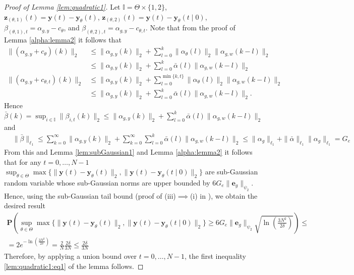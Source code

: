 \documentclass{article}
\newcommand{\e}{\mathbf{e}}
\newcommand{\y}{\mathbf{y}}
\newcommand{\z}{\mathbf{z}}
\newcommand{\bP}{\mathbf{P}}
\begin{document}
\begin{proof}[Proof of Lemma \ref{lem:quadratic1}]
    Let $\mathbb{I}=\Theta \times \{1,2\}$,
    $\z_{(\theta,1)}(t)=\y(t)-\y_{\theta}(t)$, 
    $\z_{(\theta,2)}(t)=\y(t)-\y_{\theta}(t \mid 0)$,
    $\beta_{(\theta,1),t}=\alpha_{g,y}-c_{\theta}$, and $\beta_{(\theta,2),t}=\alpha_{g,y}-c_{\theta,t}$.
    Note that from the proof of Lemma \ref{alpha:lemma2} it follows
    that 
    \begin{align*}
     \|(\alpha_{g,y}+c_{\theta})(k)\|_2 
    &\le \|\alpha_{g,y}(k)\|_2+\sum_{l=0}^{k} \|\alpha_{\theta}(l)\|_2\|\alpha_{g,w}(k-l)\|_2 \\
    &\le\|\alpha_{g,y}(k)\|_2+ \sum_{l=0}^{k} \bar{\alpha}(l)\|\alpha_{g,w}(k-l)\|_2 \\
     \|(\alpha_{g,y}+c_{\theta,t})(k)\|_2 
     &\le \|\alpha_{g,y}(k)\|_2+\sum_{l=0}^{\min\{k,t\}} \|\alpha_{\theta}(l)\|_2\|\alpha_{g,w}(k-l)\|_2\\ 
     &\le \|\alpha_{g,y}(k)\|_2+\sum_{l=0}^{k} \bar{\alpha}(l)\|\alpha_{g,w}(k-l)\|_2.
    \end{align*}
    Hence $\bar{\beta}(k)=\sup_{i \in \mathbb{I}} \|\beta_{i,t}(k)\|_2 \le \|\alpha_{g,y}(k)\|_2+\sum_{l=0}^{k} \bar{\alpha}(l)\|\alpha_{g,w}(k-l)\|_2$ and 
    \begin{align*}
    & \|\bar{\beta}\|_{\ell_1} \le \sum_{k=0}^{\infty} \|\alpha_{g,y}(k)\|_2 + \sum_{k=0}^{\infty} \sum_{l=0}^{k} \bar{\alpha}(l)\|\alpha_{g,w}(k-l)\|_2 \le 
\|\alpha_g\|_{\ell_1}+\|\bar{\alpha}\|_{\ell_1}\|\alpha_{g}\|_{\ell_1}=G_e
    \end{align*}
    From this and Lemma \ref{lem:subGaussian1} and Lemma \ref{alpha:lemma2}
    it follows that for any $t=0,\ldots,N-1$
    $\sup_{\theta \in \Theta} \max\{\|\y(t)-\y_{\theta}(t)\|_2, \|\y(t)-\y_{\theta}(t \mid 0)\|_2\}$ are sub-Gaussian random variable
    whose sub-Gaussian norms are upper bounded by 
    $6G_e \|\e_g\|_{\psi_2}$.
    Hence, using the sub-Gaussian tail bound (proof of (iii)$\implies$(i) in \cite[Proposition 2.6.1]{vershynin2026highdimensional}), we obtain the desired result
    \begin{multline*}
        \bP\left( 
          \sup_{\theta \in \Theta} \max\{\|\y(t)-\y_{\theta}(t)\|_2, \|\y(t)-\y_{\theta}(t \mid 0)\|_2\} \ge 6G_e \|\e_g\|_{\psi_2}\sqrt{\ln(\frac{3N^2}{2\delta})} \right) \le \\
           =2e^{-\ln(\frac{3N^2}{2\delta})} = \frac{2}{N}\frac{2\delta}{3N} \le \frac{2\delta}{3N} 
    \end{multline*}
    Therefore, by applying a union bound over $t=0,\ldots, N-1$, the first inequality
    \eqref{lem:quadratic1:eq1} of 
    the lemma follows. 


\end{proof}
\end{document}
